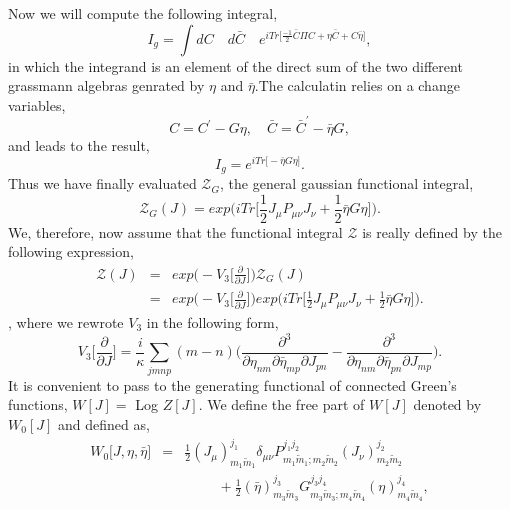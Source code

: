 \documentclass[a4paper,11pt]{article} %
\numberwithin{equation}{section} %
\numberwithin{figure}{section} %
\theoremstyle{plain} %
\theoremstyle{definition} %
\theoremstyle{remark} %
\begin{document}
\noindent
Now we will compute the following integral, 
\begin{equation*}
 I_g = \int dC \quad d\bar{C} \quad e^{i Tr\big[ \frac{-1}{2} \bar{C} \Pi C + \eta \bar{C} + C \bar{\eta} \big] },
\end{equation*}
in which the integrand is an element of the direct sum of the two different grassmann algebras genrated by $\eta$ and $\bar{\eta}$.The calculatin relies on a change variables,
\begin{equation*}
 C = C^{'} - G \eta,  \quad \bar{C} = \bar{C}^{'} - \bar{\eta} G,
\end{equation*}
and leads to the result,
\begin{equation*}
 I_g = e^{i Tr\big[ - \bar{\eta} G \eta \big] }.
\end{equation*}
Thus we have finally evaluated $\mathcal{Z}_{G}$, the general gaussian functional integral,
\begin{equation*}
 \mathcal{Z}_{G} (J) = exp\Big( i Tr\Big[ \frac{1}{2} J_\mu P_{\mu \nu} J_{\nu} + \frac{1}{2} \bar{\eta} G \eta \Big] \Big).
\end{equation*}
We, therefore, now assume that the functional integral $\mathcal{Z}$ is really defined by the following expression,
\begin{eqnarray*}
 \mathcal{Z} (J) &=& exp\big( - V_3 \Big[\frac{\partial}{\partial J} \Big] \big) \mathcal{Z}_{G} (J) \\
                 &=& exp\big( - V_3 \Big[\frac{\partial}{\partial J} \Big] \big) exp\Big( i Tr\Big[ \frac{1}{2} J_\mu P_{\mu \nu} J_{\nu} + \frac{1}{2} \bar{\eta} G \eta \Big] \Big). 
\end{eqnarray*},
where we rewrote $V_3$ in the following form,
\begin{equation*}
 V_3 \Bigg[ \frac{\partial}{\partial J} \Bigg] = \frac{i}{\kappa} \sum_{j m n p} ( m - n ) \Bigg( \frac{\partial^{3}}{\partial \eta_{nm} \partial \bar{\eta}_{mp} \partial J_{pn}} -  \frac{\partial^{3}}{\partial \eta_{nm} \partial \bar{\eta}_{pn} \partial J_{mp}} \Bigg).
\end{equation*}
It is convenient to pass to the generating functional of connected Green's functions, $W[J]=$ Log $Z[J]$. We define the free part of $W[J]$ denoted by $W_{0}[J]$ and defined as,
\begin{eqnarray*}
 W_{0}\big[J,\eta, \bar{\eta} \big]      &=& \frac{1}{2} (J_{\mu})^{j_1}_{m_1 \tilde{m}_1} \delta_{\mu \nu} P^{j_1 j_2}_{m_1 \tilde{m}_1 ; m_2 \tilde{m}_2} (J_{\nu})^{j_2}_{m_2 \tilde{m}_2} \\
                                                   && \hspace{1cm} + \frac{1}{2} (\bar{\eta})^{j_3}_{m_3 \tilde{m}_3} G^{j_3 j_4}_{m_3 \tilde{m}_3 ; m_4 \tilde{m}_4} (\eta)^{j_4}_{m_4 \tilde{m}_4},                                 
\end{eqnarray*}
\end{document}
